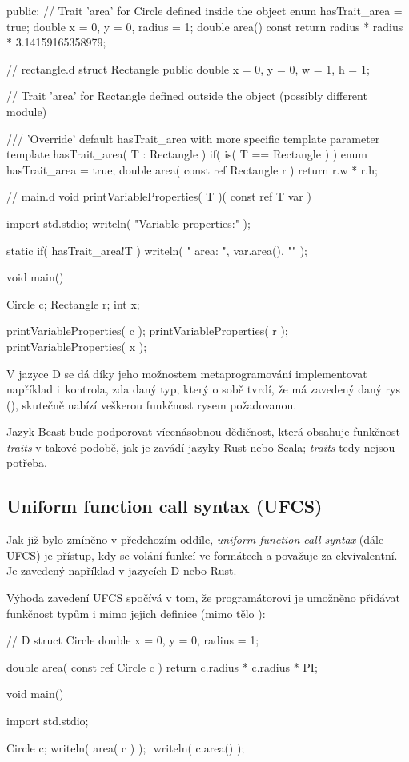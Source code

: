 \begin{itemize}
\begin{dcode}
{public:
	// Trait 'area' for Circle defined inside the object
	enum hasTrait_area = true;
	double x = 0, y = 0, radius = 1;
	double area() const {
		return radius * radius * 3.14159165358979;	
	}	
	
}

// rectangle.d
struct Rectangle {
	public double x = 0, y = 0, w = 1, h = 1;
}

// Trait 'area' for Rectangle defined outside the object (possibly different module)

/// 'Override' default hasTrait_area with more specific template parameter
template hasTrait_area( T : Rectangle ) if( is( T == Rectangle ) ) {
	enum hasTrait_area = true;
}
double area( const ref Rectangle r ) {
	return r.w * r.h;
}


// main.d
void printVariableProperties( T )( const ref T var ) {
	import std.stdio;
	writeln( "Variable properties:\n" );
	
	static if( hasTrait_area!T )
		writeln( "  area: ", var.area(), "\n" );
}

void main() {
	Circle c;
	Rectangle r;
	int x;
	
	printVariableProperties( c );
	printVariableProperties( r );
	printVariableProperties( x );
}
	\end{dcode}

	V jazyce D se dá díky jeho možnostem metaprogramování implementovat například i~kontrola, zda daný typ, který o sobě tvrdí, že má zavedený daný rys (), skutečně nabízí veškerou funkčnost rysem požadovanou.

\end{itemize}

Jazyk Beast bude podporovat vícenásobnou dědičnost, která obsahuje funkčnost \textit{traits} v takové podobě, jak je zavádí jazyky Rust nebo Scala; \textit{traits} tedy nejsou potřeba.

\subsection{Uniform function call syntax (UFCS)} \label{ufcs}
Jak již bylo zmíněno v předchozím oddíle, \textit{uniform function call syntax} (dále UFCS) je přístup, kdy se volání funkcí ve formátech  a  považuje za ekvivalentní. Je zavedený například v jazycích D \cite{BrightUFCS} nebo Rust.

Výhoda zavedení UFCS spočívá v tom, že programátorovi je umožněno přidávat funkčnost typům i mimo jejich definice (mimo tělo ):
\begin{dcode}
// D
struct Circle {
	double x = 0, y = 0, radius = 1;
}

double area( const ref Circle c ) {
	return c.radius * c.radius * PI;
}

void main() {
	import std.stdio;
	
	Circle c;
	writeln( area( c ) ); $\label{ufcs:1}$
	writeln( c.area() ); $\label{ufcs:2}$
}
\end{dcode}

